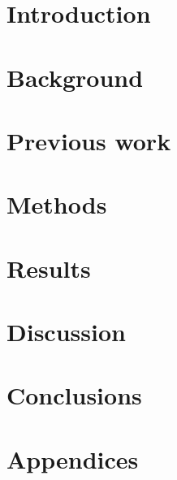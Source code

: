 \documentclass[a4paper, 12pt, openany]{book} %
\begin{document}

\chapter{Introduction}

\cleardoublepage


\chapter{Background}

\cleardoublepage


\chapter{Previous work}

\cleardoublepage


\chapter{Methods}

\cleardoublepage


\chapter{Results}

\cleardoublepage


\chapter{Discussion}

\cleardoublepage


\chapter{Conclusions}

\cleardoublepage


\printbibliography[title={References}] %
\cleardoublepage


\chapter*{\LARGE \textbf{Appendices}}
\fancyhf{} %
\renewcommand{\headrulewidth}{0pt} %
\fancyfoot[C]{\thepage} %

\appendix

\end{document}
